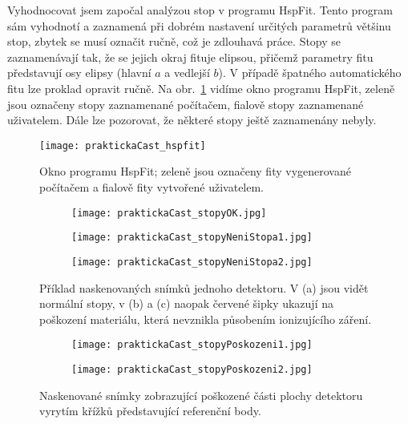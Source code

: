 Vyhodnocovat jsem započal analýzou stop v programu HspFit. Tento program sám vyhodnotí a zaznamená při dobrém nastavení určitých parametrů většinu stop, zbytek se musí označit ručně, což je zdlouhavá práce. Stopy se zaznamenávají tak, že se jejich okraj fituje elipsou, přičemž parametry fitu představují osy elipsy (hlavní $a$ a vedlejší $b$). V případě špatného automatického fitu lze proklad opravit ručně. Na obr.~\ref{fig:praktickaCast_hspfit} vidíme okno programu HspFit, zeleně jsou označeny stopy zaznamenané počítačem, fialově stopy zaznamenané uživatelem. Dále lze pozorovat, že některé stopy ještě zaznamenány nebyly. 
\begin{figure}[ht]
  \centering
  \texttt{[image: praktickaCast\_hspfit]}
  \caption{Okno programu HspFit; zeleně jsou označeny fity vygenerované počítačem a fialově fity vytvořené uživatelem.~\cite{dosis_HSP1000}}
  \label{fig:praktickaCast_hspfit}
\end{figure}
\begin{figure}[p]
  \centering
  \begin{subfigure}{0.7\textwidth}
	\texttt{[image: praktickaCast\_stopyOK.jpg]}
	\caption{}
  \end{subfigure}
  \begin{subfigure}{0.7\textwidth}
	\texttt{[image: praktickaCast\_stopyNeniStopa1.jpg]}
	\caption{}
  \end{subfigure}
  \begin{subfigure}{0.7\textwidth}
	\texttt{[image: praktickaCast\_stopyNeniStopa2.jpg]}
	\caption{}
  \end{subfigure}
  \caption{Příklad naskenovaných snímků jednoho detektoru. V (a) jsou vidět normální stopy, v (b) a (c) naopak červené šipky ukazují na poškození materiálu, která nevznikla působením ionizujícího záření.}
  \label{fig:praktickaCast_stopy}
\end{figure}
\begin{figure}[ht]
  \centering
  \begin{subfigure}{0.7\textwidth}
	\texttt{[image: praktickaCast\_stopyPoskozeni1.jpg]}
	\caption{}
  \end{subfigure}
  \begin{subfigure}{0.7\textwidth}
	\texttt{[image: praktickaCast\_stopyPoskozeni2.jpg]}
	\caption{}
  \end{subfigure}
  \caption{Naskenované snímky zobrazující poškozené části plochy detektoru vyrytím křížků představující referenční body.}
  \label{fig:praktickaCast_stopyPoskozeni}
\end{figure}

